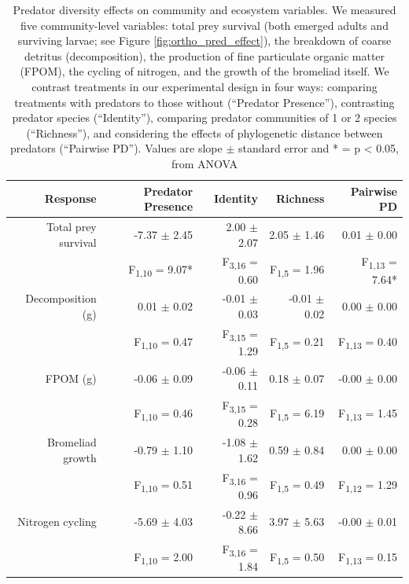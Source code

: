 \begin{table}
\begin{tabular}{rrrrr}

\toprule 
Response                & Predator Presence               & Identity                         & Richness                      & Pairwise PD             \\ 
\midrule
Total prey survival   & -7.37 $\pm$ 2.45               & 2.00 $\pm$ 2.07              & 2.05 $\pm$ 1.46              & 0.01 $\pm$ 0.00                 \\
                      & F\textsubscript{1,10} = 9.07*  & F\textsubscript{3,16} = 0.60 & F\textsubscript{1,5} = 1.96  & F\textsubscript{1,13} = 7.64*   \\
Decomposition (g)     & 0.01 $\pm$ 0.02                & -0.01 $\pm$ 0.03             & -0.01 $\pm$ 0.02             & 0.00 $\pm$ 0.00                 \\
                      & F\textsubscript{1,10} = 0.47   & F\textsubscript{3,15} = 1.29 & F\textsubscript{1,5} = 0.21  & F\textsubscript{1,13} = 0.40    \\
FPOM (g)              & -0.06 $\pm$ 0.09               & -0.06 $\pm$ 0.11             & 0.18 $\pm$ 0.07              & -0.00 $\pm$ 0.00                \\
                      & F\textsubscript{1,10} = 0.46   & F\textsubscript{3,15} = 0.28 & F\textsubscript{1,5} = 6.19  & F\textsubscript{1,13} = 1.45    \\
Bromeliad growth      & -0.79 $\pm$ 1.10               & -1.08 $\pm$ 1.62             & 0.59 $\pm$ 0.84              & 0.00 $\pm$ 0.00                 \\
                      & F\textsubscript{1,10} = 0.51   & F\textsubscript{3,16} = 0.96 & F\textsubscript{1,5} = 0.49  & F\textsubscript{1,12} = 1.29    \\
Nitrogen cycling      & -5.69 $\pm$ 4.03               & -0.22 $\pm$ 8.66             & 3.97 $\pm$ 5.63              & -0.00 $\pm$ 0.01                \\
                      & F\textsubscript{1,10} = 2.00   & F\textsubscript{3,16} = 1.84 & F\textsubscript{1,5} = 0.50  &  F\textsubscript{1,13} = 0.15   \\
\bottomrule
\end{tabular}
\caption[Predator diversity effects on community and ecosystem
variables.]{Predator diversity effects on community and ecosystem
variables. We measured five community-level variables: total prey
survival (both emerged adults and surviving larvae; see Figure \ref{fig:ortho_pred_effect}), the
breakdown of coarse detritus (decomposition), the production of fine
particulate organic matter (FPOM), the cycling of nitrogen, and the
growth of the bromeliad itself. We contrast treatments in our
experimental design in four ways: comparing treatments with predators to
those without (``Predator Presence''), contrasting predator species
(``Identity''), comparing predator communities of 1 or 2 species
(``Richness''), and considering the effects of phylogenetic distance
between predators (``Pairwise PD''). Values are slope $\pm$ standard error
and * = p \textless{} 0.05, from ANOVA}
\label{tab:pdeffects}
\end{table}

